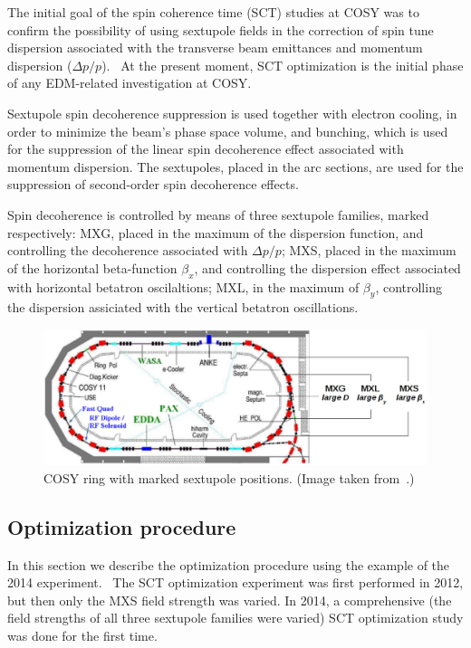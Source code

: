 \newcommand{\dpop}{\Delta p/p}

The initial goal of the spin coherence time (SCT) studies at COSY was to 
confirm the possibility of using sextupole fields in the correction of spin tune 
dispersion associated with the transverse beam emittances and 
momentum dispersion ($\dpop$).~\cite{COSY:SCT:IPAC15}
At the present moment, SCT optimization is the initial phase of any EDM-related 
investigation at COSY.

Sextupole spin decoherence suppression is used together with electron cooling, in order to minimize 
the beam's phase space volume, and bunching, which is used for the suppression of the linear spin
decoherence effect associated with momentum dispersion.
The sextupoles, placed in the arc sections, are used for the suppression of
second-order spin decoherence effects.

Spin decoherence is controlled by means of three sextupole families, marked respectively: MXG, 
placed in the maximum of the dispersion function, and controlling the decoherence associated with $\dpop$;
MXS, placed in the maximum of the horizontal beta-function $\beta_x$, and controlling the dispersion effect
associated with horizontal betatron oscilaltions; MXL, in the maximum of $\beta_y$, controlling the dispersion
assiciated with the vertical betatron oscillations.

\begin{figure}[h]\centering
	\includegraphics[width=\linewidth]{images/chapter4/COSY-sextupoles}
	\caption{COSY ring with marked sextupole positions. (Image taken from~\cite{Guidoboni:STORI14}.)}
\end{figure}

\subsection{Optimization procedure}
In this section we describe the optimization procedure using the example of the 2014 experiment.~\cite{Guidoboni:STORI14}
The SCT optimization experiment was first performed in 2012, but then only the MXS field strength was varied.
In 2014, a comprehensive (the field strengths of all three sextupole families were varied) SCT optimization
study was done for the first time.

